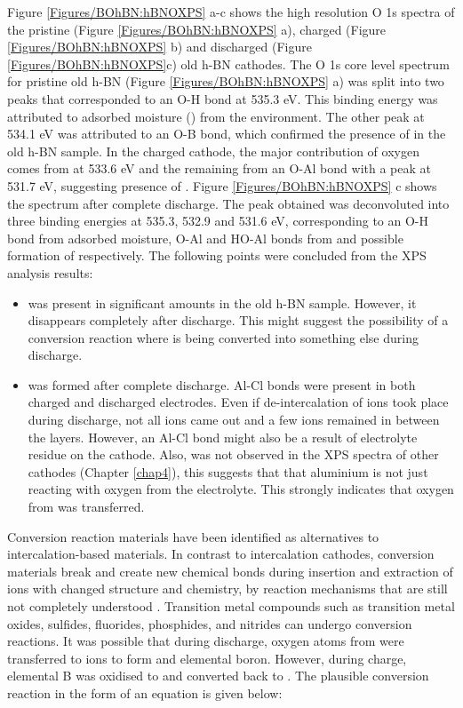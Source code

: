 Figure \ref{Figures/BOhBN:hBNOXPS} a-c shows the high resolution O 1s spectra of the pristine (Figure \ref{Figures/BOhBN:hBNOXPS} a), charged (Figure \ref{Figures/BOhBN:hBNOXPS} b) and discharged (Figure \ref{Figures/BOhBN:hBNOXPS}c) old h-BN cathodes. The O 1s core level spectrum for pristine old h-BN (Figure \ref{Figures/BOhBN:hBNOXPS} a) was split into two peaks that corresponded to an O-H bond at 535.3 eV. This binding energy was attributed to adsorbed moisture () from the environment. The other peak at 534.1 eV was attributed to an O-B bond, which confirmed the presence of  in the old h-BN sample. In the charged cathode, the major contribution of oxygen comes from  at 533.6 eV and the remaining from an O-Al bond with a peak at 531.7 eV, suggesting presence of .  Figure \ref{Figures/BOhBN:hBNOXPS} c shows the spectrum after complete discharge. The peak obtained was deconvoluted into three binding energies at 535.3, 532.9 and 531.6 eV, corresponding to an O-H bond from adsorbed moisture, O-Al and HO-Al bonds from  and possible formation of  respectively. The following points were concluded from the XPS analysis results:
\begin{itemize}
    \item {} was present in significant amounts in the old h-BN sample. However, it disappears completely after discharge. This might suggest the possibility of a conversion reaction where  is being converted into something else during discharge.  
    \item {} was formed after complete discharge. Al-Cl bonds were present in both charged and discharged electrodes. Even if de-intercalation of ions took place during discharge, not all ions came out and a few  ions remained in between the layers. However, an Al-Cl bond might also be a result of electrolyte residue on the cathode. Also,  was not observed in the XPS spectra of other cathodes (Chapter \ref{chap4}), this suggests that that aluminium is not just reacting with oxygen from the electrolyte. This strongly indicates  that oxygen from  was transferred. 
\end{itemize}

Conversion reaction materials have been identified as alternatives to intercalation-based materials. In contrast to intercalation cathodes, conversion materials break and create new chemical bonds during insertion and extraction of ions with changed structure and chemistry, by reaction mechanisms that are still not completely understood \cite{wu_conversion_2017}. Transition metal compounds such as transition metal oxides, sulfides, fluorides, phosphides, and nitrides can undergo conversion reactions. It was possible that during discharge, oxygen atoms from  were transferred to  ions to form  and elemental boron. However, during charge, elemental B was oxidised to  and  converted back to . The plausible conversion reaction in the form of an equation is given below: 

